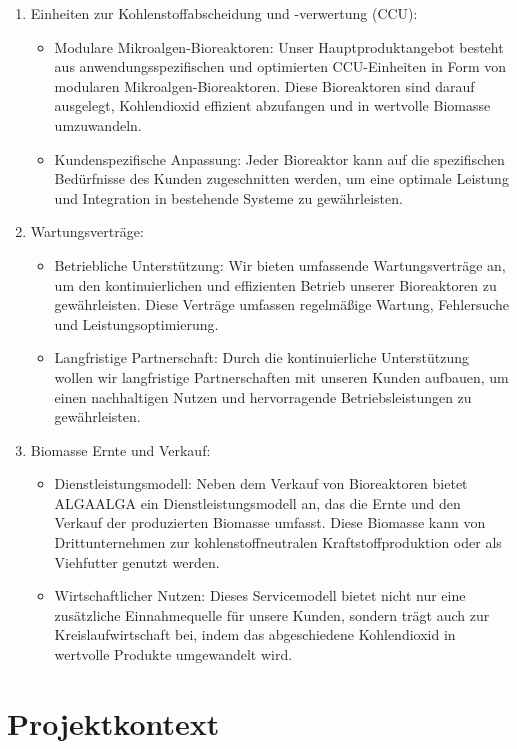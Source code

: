 \begin{enumerate}
    \item Einheiten zur Kohlenstoffabscheidung und -verwertung (CCU):
    \begin{itemize}
        \item Modulare Mikroalgen-Bioreaktoren: Unser Hauptproduktangebot besteht aus anwendungsspezifischen und optimierten CCU-Einheiten in Form von modularen Mikroalgen-Bioreaktoren.
        Diese Bioreaktoren sind darauf ausgelegt, Kohlendioxid effizient abzufangen und in wertvolle Biomasse umzuwandeln.
        \item Kundenspezifische Anpassung: Jeder Bioreaktor kann auf die spezifischen Bedürfnisse des Kunden zugeschnitten werden, um eine optimale Leistung und Integration in bestehende Systeme zu gewährleisten.
    \end{itemize}
    \item Wartungsverträge:
    \begin{itemize}
        \item Betriebliche Unterstützung: Wir bieten umfassende Wartungsverträge an, um den kontinuierlichen und effizienten Betrieb unserer Bioreaktoren zu gewährleisten.
        Diese Verträge umfassen regelmäßige Wartung, Fehlersuche und Leistungsoptimierung.
        \item Langfristige Partnerschaft: Durch die kontinuierliche Unterstützung wollen wir langfristige Partnerschaften mit unseren Kunden aufbauen, um einen nachhaltigen Nutzen und hervorragende Betriebsleistungen zu gewährleisten.
    \end{itemize}
    \item Biomasse Ernte und Verkauf:
    \begin{itemize}
        \item Dienstleistungsmodell: Neben dem Verkauf von Bioreaktoren bietet ALGAALGA ein Dienstleistungsmodell an, das die Ernte und den Verkauf der produzierten Biomasse umfasst.
        Diese Biomasse kann von Drittunternehmen zur kohlenstoffneutralen Kraftstoffproduktion oder als Viehfutter genutzt werden.
        \item Wirtschaftlicher Nutzen: Dieses Servicemodell bietet nicht nur eine zusätzliche Einnahmequelle für unsere Kunden, sondern trägt auch zur Kreislaufwirtschaft bei, indem das abgeschiedene Kohlendioxid in wertvolle Produkte umgewandelt wird.
    \end{itemize}
\end{enumerate}

\section{Projektkontext}